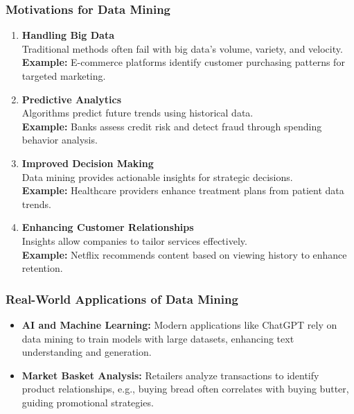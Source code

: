 \documentclass[aspectratio=169]{beamer}
\begin{document}
\begin{frame}[fragile]
    \frametitle{Motivations for Data Mining}
    \begin{enumerate}
        \item \textbf{Handling Big Data}\\
              Traditional methods often fail with big data's volume, variety, and velocity.\\
              \textbf{Example:} E-commerce platforms identify customer purchasing patterns for targeted marketing.

        \item \textbf{Predictive Analytics}\\
              Algorithms predict future trends using historical data.\\
              \textbf{Example:} Banks assess credit risk and detect fraud through spending behavior analysis.

        \item \textbf{Improved Decision Making}\\
              Data mining provides actionable insights for strategic decisions.\\
              \textbf{Example:} Healthcare providers enhance treatment plans from patient data trends.

        \item \textbf{Enhancing Customer Relationships}\\
              Insights allow companies to tailor services effectively.\\
              \textbf{Example:} Netflix recommends content based on viewing history to enhance retention.
    \end{enumerate}
\end{frame}

\begin{frame}[fragile]
    \frametitle{Real-World Applications of Data Mining}
    \begin{itemize}
        \item \textbf{AI and Machine Learning:} Modern applications like ChatGPT rely on data mining to train models with large datasets, enhancing text understanding and generation.
        \item \textbf{Market Basket Analysis:} Retailers analyze transactions to identify product relationships, e.g., buying bread often correlates with buying butter, guiding promotional strategies.
    \end{itemize}
\end{frame}
\end{document}
